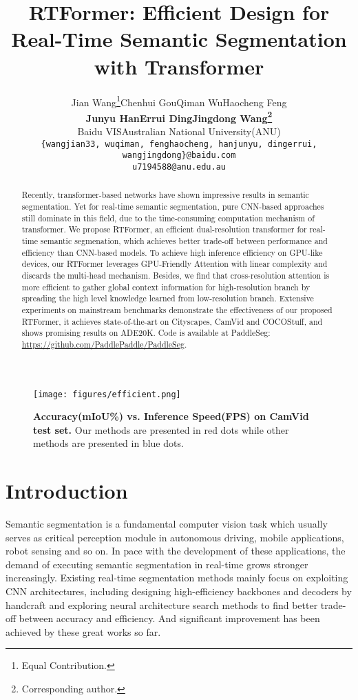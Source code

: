 \documentclass{article}
\title{RTFormer: Efficient Design for Real-Time Semantic Segmentation with Transformer}
\author{Jian Wang\thanks{Equal Contribution.}\quad Chenhui Gou\quad Qiman Wu\quad Haocheng Feng\\
\textbf{Junyu Han\quad Errui Ding\quad Jingdong Wang\thanks{Corresponding author.}}\\
Baidu VIS\quad Australian National University(ANU)\\
\texttt{\{wangjian33, wuqiman, fenghaocheng, hanjunyu, dingerrui, wangjingdong\}@baidu.com}\\
\texttt{u7194588@anu.edu.au}\\
}
\begin{document}
\maketitle

\begin{abstract}
  
Recently, transformer-based networks have shown impressive results in semantic segmentation. Yet for real-time semantic segmentation, pure CNN-based approaches still dominate in this field, due to the time-consuming computation mechanism of transformer. We propose RTFormer, an efficient dual-resolution transformer for real-time semantic segmenation, which achieves better trade-off between performance and efficiency than CNN-based models. To achieve high inference efficiency on GPU-like devices, our RTFormer leverages GPU-Friendly Attention with linear complexity and discards the multi-head mechanism. Besides, we find that cross-resolution attention is more efficient to gather global context information for high-resolution branch by spreading the high level knowledge learned from low-resolution branch. Extensive experiments on mainstream benchmarks demonstrate the effectiveness of our proposed RTFormer, it achieves state-of-the-art on Cityscapes, CamVid and COCOStuff, and shows promising results on ADE20K. Code is available at PaddleSeg\cite{liu2021paddleseg}: \href{https://github.com/PaddlePaddle/PaddleSeg}{https://github.com/PaddlePaddle/PaddleSeg}.

\end{abstract}

\begin{wrapfigure}[17]{r}{6cm}
\centering
\texttt{[image: figures/efficient.png]}
\caption{\textbf{Accuracy(mIoU\%) vs. Inference Speed(FPS) on CamVid\cite{CamVid} test set.} Our methods are presented in red dots while other methods are presented in blue dots.}
\label{fig:intro}
\end{wrapfigure}

\section{Introduction}

Semantic segmentation is a fundamental computer vision task which usually serves as critical perception module in autonomous driving, mobile applications, robot sensing and so on. In pace with the development of these applications, the demand of executing semantic segmentation in real-time grows stronger increasingly. Existing real-time segmentation methods mainly focus on exploiting CNN architectures, including designing high-efficiency backbones and decoders\cite{zhao2018icnet, yu2018bisenet, yu2021bisenet, hong2021deep, li2020semantic, fan2021rethinking, chao2019hardnet, orvsic2021efficient} by handcraft and exploring neural architecture search methods to find better trade-off between accuracy and efficiency\cite{zhang2019customizable, lin2020graph, li2019partial, chen2019fasterseg}. And significant improvement has been achieved by these great works so far.
\end{document}
